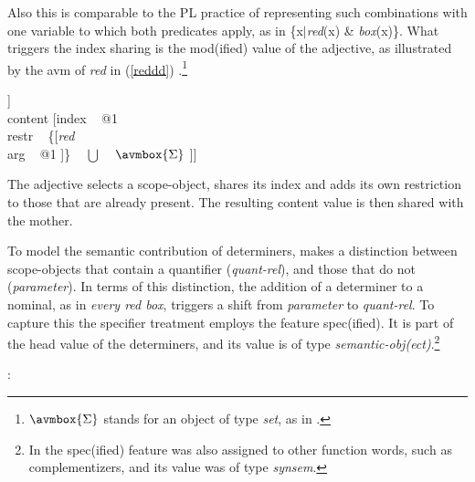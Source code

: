 \documentclass[output=paper]{langsci/langscibook}
\begin{document}
\noindent
Also this is comparable to the PL practice of representing such 
combinations with one variable to which both predicates apply, as in 
\{x$|${\it red}(x) \& {\it box}(x)\}. What triggers the index sharing is 
the {\sc mod(ified)} value of the adjective, as illustrated by the {\sc avm} of 
{\it red\/} in (\ref{reddd}) \citep[55]{PS94}.\footnote{$\avmbox{\Sigma}$ 
stands for an object of type {\it set}, as in \citet{GS00}.} 

\begin{exe} 
\ex\label{reddd}
\begin{avm}
[cat|head [{\it adjective}                               \\
           mod|loc|content [{\it scope-obj\/}            \\
                            index ~ @1                   \\
                            restr ~ $\avmbox{\Sigma}$ ]] \\
 content [index ~ @1                                     \\
          restr ~ \{[{\it red\/}                         \\
                     arg ~ @1 ]\} ~ $\bigcup$ ~ $\avmbox{\Sigma}$ ]]
\end{avm}
\end{exe}

\noindent
The adjective selects a scope-object, shares its index and adds its own 
restriction to those that are already present. The resulting {\sc content} 
value is then shared with the mother.

To model the semantic contribution of determiners, \citet{GS00} 
makes a distinction between scope-objects that contain a quantifier 
({\it quant-rel\/}), and those that do not ({\it parameter\/}). 
In terms of this distinction, the 
addition of a determiner to a nominal, as in {\it every red box}, 
triggers a shift from {\it parameter\/} to {\it quant-rel}. 
To capture this the specifier treatment employs the feature {\sc spec(ified)}. 
It is part of the {\sc head} value of the determiners, and its value is of type 
{\it semantic-obj(ect)}.\footnote{In \citet[45]{PS94} the {\sc spec(ified)}
feature was also assigned to other function words, such as complementizers, 
and its value was of type {\it synsem}.}   

\begin{exe} 
 : \begin{avm}  \end{avm}  
\end{exe} 
\end{document}
